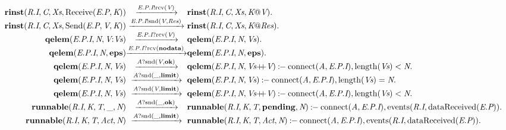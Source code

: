 \[
\begin{array}{r@{}c@{}l}
\\\Pfact{\Tstep{\Trinst{\Tr{\Tvar{R}}{\Tvar{I}}}{\Tvar{C}}{\Tvar{Xs}}{\TrteReceive{\Te{\Tvar{E}}{\Tvar{P}}}{\Tvar{K}}}}{\Tsay{\Tep{\Tvar{E}}{\Tvar{P}}{\Tvar{I}}}{\Trcv{\Tvar{V}}}}{\Trinst{\Tr{\Tvar{R}}{\Tvar{I}}}{\Tvar{C}}{\Tvar{Xs}}{\Tap{\Tvar{K}}{\Tvar{V}}}}}.
\\\Pfact{\Tstep{\Trinst{\Tr{\Tvar{R}}{\Tvar{I}}}{\Tvar{C}}{\Tvar{Xs}}{\TrteSend{\Te{\Tvar{E}}{\Tvar{P}}}{\Tvar{V}}{\Tvar{K}}}}{\Tsay{\Tep{\Tvar{E}}{\Tvar{P}}{\Tvar{I}}}{\Tsnd{\Tvar{V}}{\Tvar{Res}}}}{\Trinst{\Tr{\Tvar{R}}{\Tvar{I}}}{\Tvar{C}}{\Tvar{Xs}}{\Tap{\Tvar{K}}{\Tvar{Res}}}}}.
\\\Pfact{\Tstep{\Tqelem{\Tep{\Tvar{E}}{\Tvar{P}}{\Tvar{I}}}{\Tvar{N}}{\Tcons{\Tvar{V}}{\Tvar{Vs}}}}{\Thear{\Tep{\Tvar{E}}{\Tvar{P}}{\Tvar{I}}}{\Trcv{\Tvar{V}}}}{\Tqelem{\Tep{\Tvar{E}}{\Tvar{P}}{\Tvar{I}}}{\Tvar{N}}{\Tvar{Vs}}}}.
\\\Pfact{\Tstep{\Tqelem{\Tep{\Tvar{E}}{\Tvar{P}}{\Tvar{I}}}{\Tvar{N}}{\Tatom{eps}}}{\Thear{\Tep{\Tvar{E}}{\Tvar{P}}{\Tvar{I}}}{\Trcv{\Tatom{nodata}}}}{\Tqelem{\Tep{\Tvar{E}}{\Tvar{P}}{\Tvar{I}}}{\Tvar{N}}{\Tatom{eps}}}}.
\\\Prule{\Tstep{\Tqelem{\Tep{\Tvar{E}}{\Tvar{P}}{\Tvar{I}}}{\Tvar{N}}{\Tvar{Vs}}}{\Thear{\Tvar{A}}{\Tsnd{\Tvar{V}}{\Tatom{ok}}}}{\Tqelem{\Tep{\Tvar{E}}{\Tvar{P}}{\Tvar{I}}}{\Tvar{N}}{\Tseq{\Tvar{Vs}}{\Tvar{V}}}}}{\Tconnect{\Tvar{A}}{\Tep{\Tvar{E}}{\Tvar{P}}{\Tvar{I}}},\Tless{\Tlength{\Tvar{Vs}}}{\Tvar{N}}}.
\\\Prule{\Tstep{\Tqelem{\Tep{\Tvar{E}}{\Tvar{P}}{\Tvar{I}}}{\Tvar{N}}{\Tvar{Vs}}}{\Thear{\Tvar{A}}{\Tsnd{\_}{\Tatom{limit}}}}{\Tqelem{\Tep{\Tvar{E}}{\Tvar{P}}{\Tvar{I}}}{\Tvar{N}}{\Tvar{Vs}}}}{\Tconnect{\Tvar{A}}{\Tep{\Tvar{E}}{\Tvar{P}}{\Tvar{I}}},\Tequal{\Tlength{\Tvar{Vs}}}{\Tvar{N}}}.
\\\Prule{\Tstep{\Tqelem{\Tep{\Tvar{E}}{\Tvar{P}}{\Tvar{I}}}{\Tvar{N}}{\Tvar{Vs}}}{\Thear{\Tvar{A}}{\Tsnd{\Tvar{V}}{\Tatom{limit}}}}{\Tqelem{\Tep{\Tvar{E}}{\Tvar{P}}{\Tvar{I}}}{\Tvar{N}}{\Tseq{\Tvar{Vs}}{\Tvar{V}}}}}{\Tconnect{\Tvar{A}}{\Tep{\Tvar{E}}{\Tvar{P}}{\Tvar{I}}},\Tless{\Tlength{\Tvar{Vs}}}{\Tvar{N}}}.
\\\Prule{\Tstep{\Trunnable{\Tr{\Tvar{R}}{\Tvar{I}}}{\Tvar{K}}{\Tvar{T}}{\_}{\Tvar{N}}}{\Thear{\Tvar{A}}{\Tsnd{\_}{\Tatom{ok}}}}{\Trunnable{\Tr{\Tvar{R}}{\Tvar{I}}}{\Tvar{K}}{\Tvar{T}}{\Tatom{pending}}{\Tvar{N}}}}{\Tconnect{\Tvar{A}}{\Tep{\Tvar{E}}{\Tvar{P}}{\Tvar{I}}},\Tevents{\Tr{\Tvar{R}}{\Tvar{I}}}{\TdataReceived{\Te{\Tvar{E}}{\Tvar{P}}}}}.
\\\Prule{\Tstep{\Trunnable{\Tr{\Tvar{R}}{\Tvar{I}}}{\Tvar{K}}{\Tvar{T}}{\Tvar{Act}}{\Tvar{N}}}{\Thear{\Tvar{A}}{\Tsnd{\_}{\Tatom{limit}}}}{\Trunnable{\Tr{\Tvar{R}}{\Tvar{I}}}{\Tvar{K}}{\Tvar{T}}{\Tvar{Act}}{\Tvar{N}}}}{\Tconnect{\Tvar{A}}{\Tep{\Tvar{E}}{\Tvar{P}}{\Tvar{I}}},\Tevents{\Tr{\Tvar{R}}{\Tvar{I}}}{\TdataReceived{\Te{\Tvar{E}}{\Tvar{P}}}}}.
\end{array}
\]
